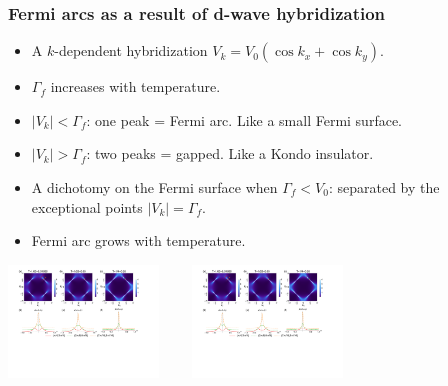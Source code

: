 \documentclass[xcolor=table, 10pt, aspectratio=169]{beamer}
\begin{document}
\begin{frame}
\frametitle{Fermi arcs as a result of d-wave hybridization}
\begin{itemize}
\item A $k$-dependent hybridization $V_k=V_0(\cos k_x+\cos k_y)$.
\item $\Gamma_f$ increases with temperature.
\item $|V_k|<\Gamma_f$: one peak = Fermi arc. Like a small Fermi surface.
\item $|V_k|>\Gamma_f$: two peaks = gapped. Like a Kondo insulator.
\item A dichotomy on the Fermi surface when $\Gamma_f<V_0$: separated by the exceptional points $|V_k|=\Gamma_f$.
\item Fermi arc grows with temperature.
\end{itemize}
\begin{center}
	\includegraphics[height=3cm]{arc1}~~~~
	\includegraphics[height=3cm]{arc2}
\end{center}
\end{frame}
\end{document}
